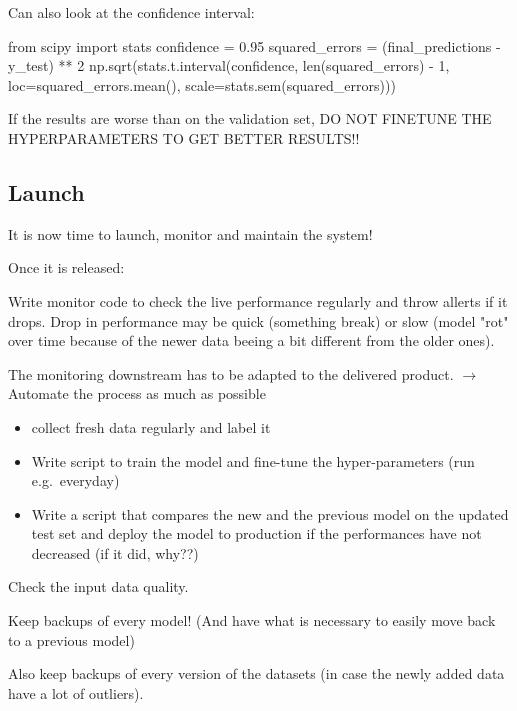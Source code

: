         Can also look at the confidence interval:
        \begin{python}
            from scipy import stats
            confidence = 0.95
            squared_errors = (final_predictions - y_test) ** 2
            np.sqrt(stats.t.interval(confidence,
                            len(squared_errors) - 1,
                            loc=squared_errors.mean(),
                            scale=stats.sem(squared_errors)))
        \end{python}
        If the results are worse than on the validation set, DO NOT FINETUNE THE HYPERPARAMETERS TO GET BETTER RESULTS!!

    \subsection{Launch}
    It is now time to launch, monitor and maintain the system!

    Once it is released:

    Write monitor code to check the live performance regularly and throw allerts if it drops.
    Drop in performance may be quick (something break) or slow (model "rot" over time because of the newer data beeing a bit different from the older ones).

    The monitoring downstream has to be adapted to the delivered product.
    $\rightarrow$ Automate the process as much as possible
    \begin{itemize}
        \item collect fresh data regularly and label it
        \item Write script to train the model and fine-tune the hyper-parameters (run e.g.\ everyday)
        \item Write a script that compares the new and the previous model on the updated test set and deploy the model to production if the performances have not decreased (if it did, why??)
    \end{itemize}

    Check the input data quality.

    Keep backups of every model!
    (And have what is necessary to easily move back to a previous model)

    Also keep backups of every version of the datasets (in case the newly added data have a lot of outliers).
